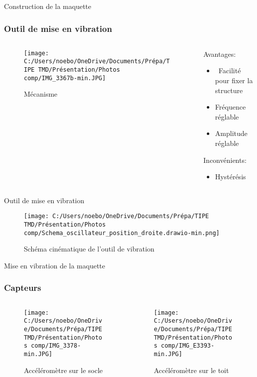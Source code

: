 \documentclass{beamer}
\begin{document}
	
	\begin{frame}{Construction de la maquette}
		\frametitle{Outil de mise en vibration}
 
		\begin{columns}
			\begin{column}{0.5\textwidth}
				\begin{figure}
					\texttt{[image: C:/Users/noebo/OneDrive/Documents/Prépa/TIPE TMD/Présentation/Photos comp/IMG\_3367b-min.JPG]}
					\caption{Mécanisme}
				\end{figure}
			\end{column}
			\begin{column}{0.5\textwidth}
				Avantages:
				\begin{itemize}
					\item\ Facilité pour fixer la structure
					\item Fréquence réglable \\
					\item Amplitude réglable 
				\end{itemize}
				\vspace{12pt}
				Inconvénients:
				
				\begin{itemize}
					\item Hystérésis
				\end{itemize}
			\end{column}
		\end{columns}
	\end{frame}

\begin{frame}{Outil de mise en vibration}
	\begin{figure}
		\texttt{[image: C:/Users/noebo/OneDrive/Documents/Prépa/TIPE TMD/Présentation/Photos comp/Schema\_oscillateur\_position\_droite.drawio-min.png]}
		\caption{Schéma cinématique de l'outil de vibration}
	\end{figure}
\end{frame}

	\begin{frame}{Mise en vibration de la maquette}
	
	\frametitle{Capteurs}
	\begin{columns}
		\begin{column}{0.25\textwidth}
			\begin{figure}
				\texttt{[image: C:/Users/noebo/OneDrive/Documents/Prépa/TIPE TMD/Présentation/Photos comp/IMG\_3378-min.JPG]}
				\caption{Accéléromètre sur le socle}
			\end{figure}
		\end{column}
		\begin{column}{0.5\textwidth}
			\begin{figure}
				\texttt{[image: C:/Users/noebo/OneDrive/Documents/Prépa/TIPE TMD/Présentation/Photos comp/IMG\_E3393-min.JPG]}
				\caption{Accéléromètre sur le toit}
			\end{figure}
		\end{column}
	\end{columns}
\end{frame}
\end{document}
